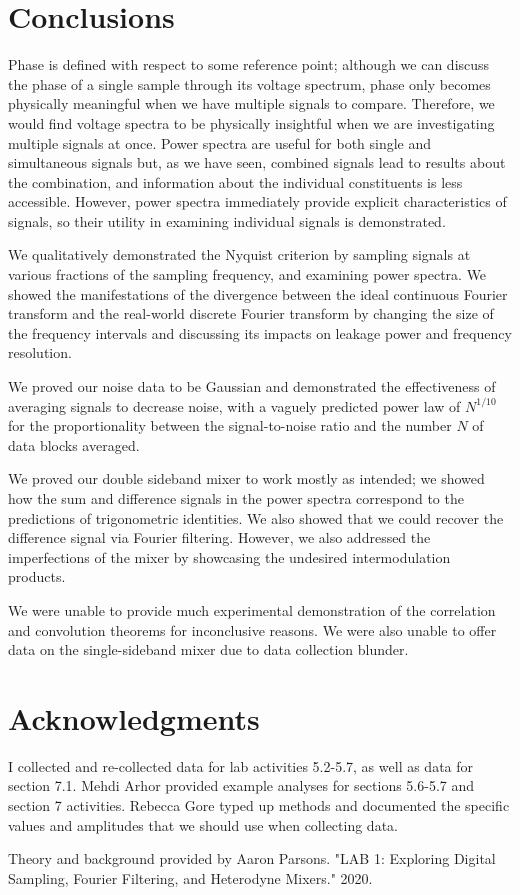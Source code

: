 \documentclass[a4paper]{article}
\begin{document}
\section{Conclusions}


\quad \quad Phase is defined with respect to some reference point; although we can discuss the phase of a single sample through its voltage spectrum, phase only becomes physically meaningful when we have multiple signals to compare. Therefore, we would find voltage spectra to be physically insightful when we are investigating multiple signals at once. Power spectra are useful for both single and simultaneous signals but, as we have seen, combined signals lead to results about the combination, and information about the individual constituents is less accessible. However, power spectra immediately provide explicit characteristics of signals, so their utility in examining individual signals is demonstrated.

We qualitatively demonstrated the Nyquist criterion by sampling signals at various fractions of the sampling frequency, and examining power spectra. We showed the manifestations of the divergence between the ideal continuous Fourier transform and the real-world discrete Fourier transform by changing the size of the frequency intervals and discussing its impacts on leakage power and frequency resolution.

We proved our noise data to be Gaussian and demonstrated the effectiveness of averaging signals to decrease noise, with a vaguely predicted power law of $N^{1/10}$ for the proportionality between the signal-to-noise ratio and the number $N$ of data blocks averaged.

We proved our double sideband mixer to work mostly as intended; we showed how the sum and difference signals in the power spectra correspond to the predictions of trigonometric identities. We also showed that we could recover the difference signal via Fourier filtering. However, we also addressed the imperfections of the mixer by showcasing the undesired intermodulation products.

We were unable to provide much experimental demonstration of the correlation and convolution theorems for inconclusive reasons. We were also unable to offer data on the single-sideband mixer due to data collection blunder.

\section{Acknowledgments}

I collected and re-collected data for lab activities 5.2-5.7, as well as data for section 7.1. Mehdi Arhor provided example analyses for sections 5.6-5.7 and section 7 activities. Rebecca Gore typed up methods and documented the specific values and amplitudes that we should use when collecting data.

Theory and background provided by Aaron Parsons. "LAB 1: Exploring Digital Sampling, Fourier Filtering, and Heterodyne Mixers." 2020.
\end{document}

